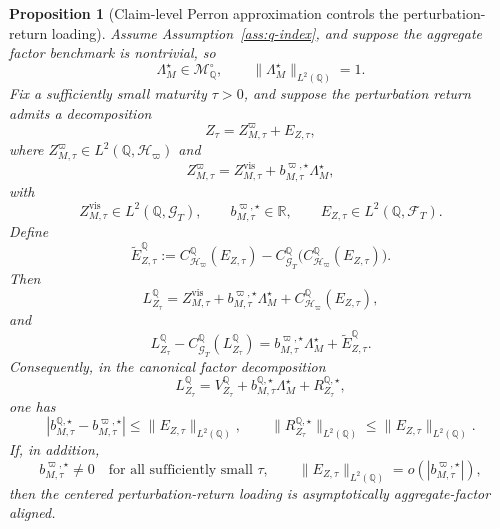 \documentclass[11pt,a4paper]{amsart}
\theoremstyle{plain}
\newtheorem{proposition}[theorem]{Proposition}
\theoremstyle{definition}
\theoremstyle{remark}
\newcommand{\R}{\mathbb{R}}
\newcommand{\QQ}{\mathbb{Q}}
\newcommand{\cF}{\mathcal{F}}
\newcommand{\cG}{\mathcal{G}}
\newcommand{\cH}{\mathcal{H}}
\newcommand{\cM}{\mathcal{M}}
\begin{document}
\begin{proposition}[Claim-level Perron approximation controls the perturbation-return loading]\label{prop:gaussian-z-approx}
Assume Assumption~\ref{ass:q-index}, and suppose the aggregate factor benchmark is nontrivial, so
\[
        \Lambda_M^\star\in \cM_\QQ^\circ,
        \qquad
        \|\Lambda_M^\star\|_{L^2(\QQ)}=1.
\]
Fix a sufficiently small maturity \(\tau>0\), and suppose the perturbation return admits a
decomposition
\[
        Z_\tau
        =
        Z_{M,\tau}^{\varpi}
        +
        E_{Z,\tau},
\]
where \(Z_{M,\tau}^{\varpi}\in L^2(\QQ,\cH_\varpi)\) and
\[
        Z_{M,\tau}^{\varpi}
        =
        Z_{M,\tau}^{\mathrm{vis}}
        +
        b_{M,\tau}^{\varpi,\star}\Lambda_M^\star,
\]
with
\[
        Z_{M,\tau}^{\mathrm{vis}}\in L^2(\QQ,\cG_T),
        \qquad
        b_{M,\tau}^{\varpi,\star}\in\R,
        \qquad
        E_{Z,\tau}\in L^2(\QQ,\cF_T).
\]
Define
\[
        \widetilde E_{Z,\tau}^\QQ
        :=
        C_{\cH_\varpi}^\QQ(E_{Z,\tau})
        -
        C_{\cG_T}^\QQ\bigl(C_{\cH_\varpi}^\QQ(E_{Z,\tau})\bigr).
\]
Then
\[
        L_{Z_\tau}^\QQ
        =
        Z_{M,\tau}^{\mathrm{vis}}
        +
        b_{M,\tau}^{\varpi,\star}\Lambda_M^\star
        +
        C_{\cH_\varpi}^\QQ(E_{Z,\tau}),
\]
and
\[
        L_{Z_\tau}^\QQ-C_{\cG_T}^\QQ(L_{Z_\tau}^\QQ)
        =
        b_{M,\tau}^{\varpi,\star}\Lambda_M^\star
        +
        \widetilde E_{Z,\tau}^\QQ.
\]
Consequently, in the canonical factor decomposition
\[
        L_{Z_\tau}^\QQ
        =
        V_{Z_\tau}^\QQ
        +
        b_{M,\tau}^{\QQ,\star}\Lambda_M^\star
        +
        R_{Z_\tau}^{\QQ,\star},
\]
one has
\[
        \left|
                b_{M,\tau}^{\QQ,\star}
                -
                b_{M,\tau}^{\varpi,\star}
        \right|
        \le
        \|E_{Z,\tau}\|_{L^2(\QQ)},
        \qquad
        \|R_{Z_\tau}^{\QQ,\star}\|_{L^2(\QQ)}
        \le
        \|E_{Z,\tau}\|_{L^2(\QQ)}.
\]
If, in addition,
\[
        b_{M,\tau}^{\varpi,\star}\neq0
        \quad\text{for all sufficiently small }\tau,
        \qquad
        \|E_{Z,\tau}\|_{L^2(\QQ)}
        =
        o\!\left(|b_{M,\tau}^{\varpi,\star}|\right),
\]
then the centered perturbation-return loading is asymptotically aggregate-factor aligned.
\end{proposition}
\end{document}
